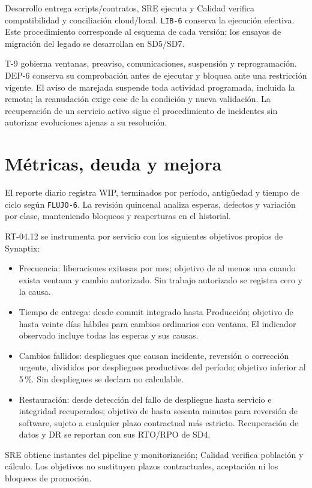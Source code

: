 Desarrollo entrega scripts/contratos, SRE ejecuta y Calidad verifica compatibilidad y conciliación cloud/local. \texttt{LIB-6} conserva la ejecución efectiva. Este procedimiento corresponde al esquema de cada versión; los ensayos de migración del legado se desarrollan en SD5/SD7. \parencite[RT-04.10, p.~11]{sd6-bt}

T-9 gobierna ventanas, preaviso, comunicaciones, suspensión y reprogramación. DEP-6 conserva su comprobación antes de ejecutar y bloquea ante una restricción vigente. El aviso de marejada suspende toda actividad programada, incluida la remota; la reanudación exige cese de la condición y nueva validación. La recuperación de un servicio activo sigue el procedimiento de incidentes sin autorizar evoluciones ajenas a su resolución. \parencites[art.~20, p.~15]{sd6-ba}[cap.~10, restricción 12, p.~26]{sd6-c07}

\section{Métricas, deuda y mejora}
El reporte diario registra WIP, terminados por período, antigüedad y tiempo de ciclo según \texttt{FLUJO-6}. La revisión quincenal analiza esperas, defectos y variación por clase, manteniendo bloqueos y reaperturas en el historial. \parencite[Flow Metrics, p.~5]{sd6-kanban}

RT-04.12 se instrumenta por servicio con los siguientes objetivos propios de Synaptix:
\begin{itemize}
\item Frecuencia: liberaciones exitosas por mes; objetivo de al menos una cuando exista ventana y cambio autorizado. Sin trabajo autorizado se registra cero y la causa.
\item Tiempo de entrega: desde commit integrado hasta Producción; objetivo de hasta veinte días hábiles para cambios ordinarios con ventana. El indicador observado incluye todas las esperas y sus causas.
\item Cambios fallidos: despliegues que causan incidente, reversión o corrección urgente, divididos por despliegues productivos del período; objetivo inferior al 5\,\%. Sin despliegues se declara no calculable.
\item Restauración: desde detección del fallo de despliegue hasta servicio e integridad recuperados; objetivo de hasta sesenta minutos para reversión de software, sujeto a cualquier plazo contractual más estricto. Recuperación de datos y DR se reportan con sus RTO/RPO de SD4.
\end{itemize}
SRE obtiene instantes del pipeline y monitorización; Calidad verifica población y cálculo. Los objetivos no sustituyen plazos contractuales, aceptación ni los bloqueos de promoción. \parencite[RT-04.12, p.~11]{sd6-bt}

